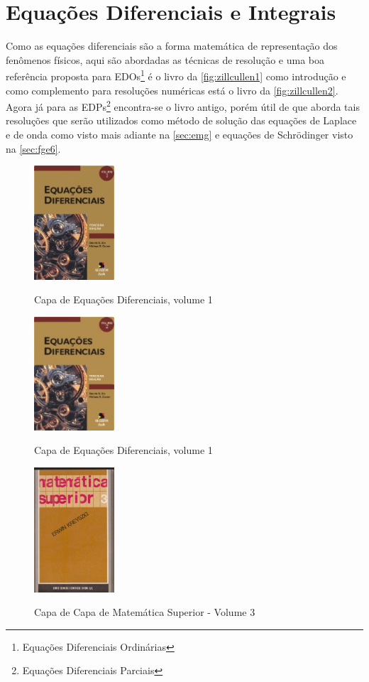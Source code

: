 \documentclass[
	12pt,				%
	openright,			%
	oneside,			%
	a4paper,			%
	english,			%
	french,				%
	spanish,			%
	brazil				%
	]{abntex2}
\begin{document}
\section{Equações Diferenciais e Integrais}\label{sec:edi}
Como as equações diferenciais são a forma matemática de representação dos fenômenos físicos, aqui são abordadas as técnicas de resolução e uma boa referência proposta para EDOs\footnote{Equações Diferenciais Ordinárias} é o livro da \autoref{fig:zillcullen1} como introdução e como complemento para resoluções numéricas está o livro da \autoref{fig:zillcullen2}. Agora já para as EDPs\footnote{Equações Diferenciais Parciais} encontra-se o livro antigo, porém útil de  que aborda tais resoluções que serão utilizados como método de solução das equações de Laplace e de onda como visto mais adiante na \autoref{sec:emg} e equações de
Schrödinger visto na \autoref{sec:fge6}.
\begin{figure}[!htb]
	\caption{Capa de Equações Diferenciais, volume 1}
	\centering
	\includegraphics[width=3cm]{zillcullen1.jpg}
	\label{fig:zillcullen1}
\end{figure}
\begin{figure}[!htb]
	\caption{Capa de Equações Diferenciais, volume 1}
	\centering
	\includegraphics[width=3cm]{zillcullen2.jpg}
	\label{fig:zillcullen2}
\end{figure}
\begin{figure}[!htb]
	\caption{Capa de Capa de Matemática Superior - Volume 3}
	\centering
	\includegraphics[width=3cm]{kreyszig.jpg}
	\label{fig:kreyszig}
\end{figure}
\end{document}
